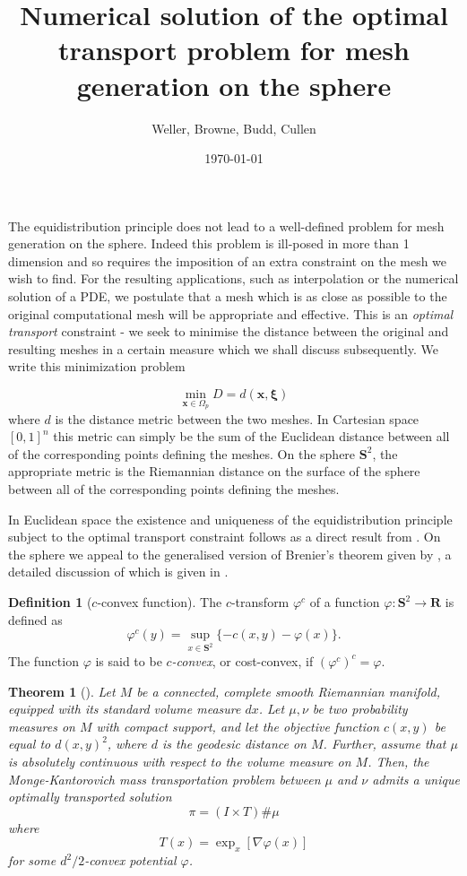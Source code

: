 \documentclass{article}
\author[1,*]{Weller, Browne, Budd, Cullen}
\title{Numerical solution of the optimal transport problem for mesh generation on the sphere}
\date{\today}
\newtheorem{theorem}{Theorem}
\theoremstyle{definition}
\newtheorem{defn}{Definition}
\begin{document}
\linenumbers
\maketitle

The equidistribution principle does not lead to a well-defined problem for mesh generation on the sphere. Indeed this problem is ill-posed in more than 1 dimension and so requires the imposition of an extra constraint on the mesh we wish to find. For the resulting applications, such as interpolation or the numerical solution of a PDE, we postulate that a mesh which is as close as possible to the original computational mesh will be appropriate and effective. This is an \emph{optimal transport} constraint - we seek to minimise the distance between the original and resulting meshes in a certain measure which we shall discuss subsequently. We write this minimization problem

\[\min_{\mathbf{x}\in \Omega_p} D=d(\mathbf{x},\mathbf{\xi})\]
where $d$ is the distance metric between the two meshes. In Cartesian space $[0,1]^n$ this metric can simply be the sum of the Euclidean distance between all of the corresponding points defining the meshes. On the sphere $\mathbf{S}^2$, the appropriate metric is the Riemannian distance on the surface of the sphere between all of the corresponding points defining the meshes.

In Euclidean space the existence and uniqueness of the equidistribution principle subject to the optimal transport constraint follows as a direct result from \citet{Brenier1991}. On the sphere we appeal to the generalised version of Brenier's theorem given by \citet{McCann2001}, a detailed discussion of which is given in \citet{villani2003}.

\begin{defn}[$c$-convex function]
The $c$-transform $\varphi^c$ of a function $\varphi: \mathbf{S}^2 \to \mathbf{R}$ is defined as 
\[\varphi^c (y) = \sup_{x\in\mathbf{S}^2} \{-c(x,y) - \varphi(x)\}.\]
The function $\varphi$ is said to be \emph{$c$-convex}, or cost-convex, if 
$(\varphi^c)^c=\varphi.$
\end{defn}

\begin{theorem}[\citet{McCann2001}]\label{mccannthm}
Let $M$ be a connected, complete smooth Riemannian manifold, equipped with its standard volume measure $dx$. Let $\mu, \nu$ be two probability measures on $M$ with compact support, and let the objective function $c(x,y)$ be equal to $d(x,y)^2$, where $d$ is the geodesic distance on $M$. Further, assume that $\mu$ is absolutely continuous with respect to the volume measure on $M$. Then, the Monge-Kantorovich mass transportation problem between $\mu$ and $\nu$ admits a unique optimally transported solution
\[\pi = (I \times T)\#\mu\]
where
\[T(x) = \exp_x [\nabla \varphi(x)]\]
for some $d^2/2$-convex potential $\varphi$. 
\end{theorem}
\end{document}
